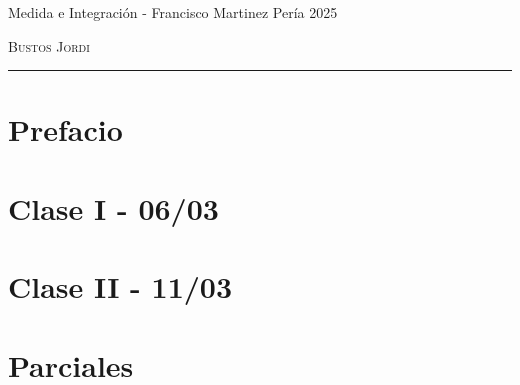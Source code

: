 \documentclass[12pt,a4paper]{book}
\begin{document}
\renewcommand{\contentsname}{\vspace{0cm} Contenido \vspace{-2cm}}

\begin{titlepage}
    \vspace*{2cm}

    \noindent
    \vspace*{0.5cm}

    \vspace{1.5cm}
    \epigraph{Medida e Integración - Francisco Martinez Pería 2025}%
    {\textsc{Bustos Jordi}}
    \null\vfill
    \vspace*{1cm}
    \noindent
    \hfill
    \begin{minipage}{0.7\linewidth}
        \begin{flushright}
            \printauthor
        \end{flushright}
    \end{minipage}
    \begin{minipage}{0.02\linewidth}
        \rule{1pt}{70pt}
    \end{minipage}
    \titlepagedecoration
\end{titlepage}

\let\cleardoublepage=\clearpage
\tableofcontents
\blankpage

\chapter*{Prefacio}

\newpage\thispagestyle{empty}\blankpage

\chapter{Clase I - 06/03 }

\newpage\thispagestyle{empty}\blankpage

\chapter{Clase II - 11/03 }

\newpage\thispagestyle{empty}\blankpage

\chapter{Parciales}


\blankpage



\nocite{*}
\end{document}
